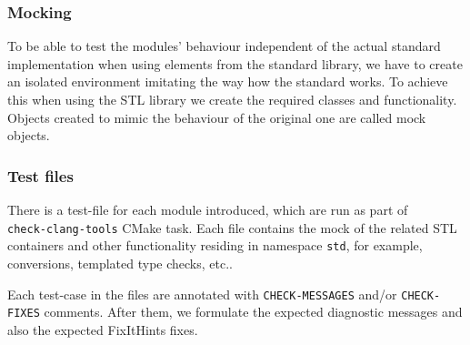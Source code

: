 \subsubsection{Mocking}
\par To be able to test the modules' behaviour independent of the actual standard implementation when using elements from the standard library, we have to create an isolated environment imitating the way how the standard works. To achieve this when using the STL library we create the required classes and functionality. Objects created to mimic the behaviour of the original one are called mock objects.
\subsubsection{Test files}
\par There is a test-file for each module introduced, which are run as part of \\\verb|check-clang-tools| CMake task. Each file contains the mock of the related STL containers and other functionality residing in namespace \verb|std|, for example, conversions, templated type checks, etc.. \medskip
\par Each test-case in the files are annotated with \verb|CHECK-MESSAGES| and/or \verb|CHECK-FIXES| comments. After them, we formulate the expected diagnostic messages and also the expected FixItHints fixes.
\pagebreak
